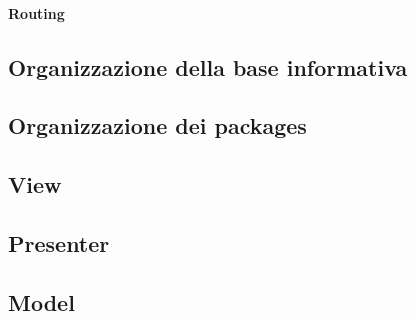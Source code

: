 \paragraph*{Routing\\}

\newpage

\subsection{Organizzazione della base informativa}

\newpage

\subsection{Organizzazione dei packages}

\newpage

\subsection{View}

\newpage

\subsection{Presenter}

\newpage
\subsection{Model}

\newpage
